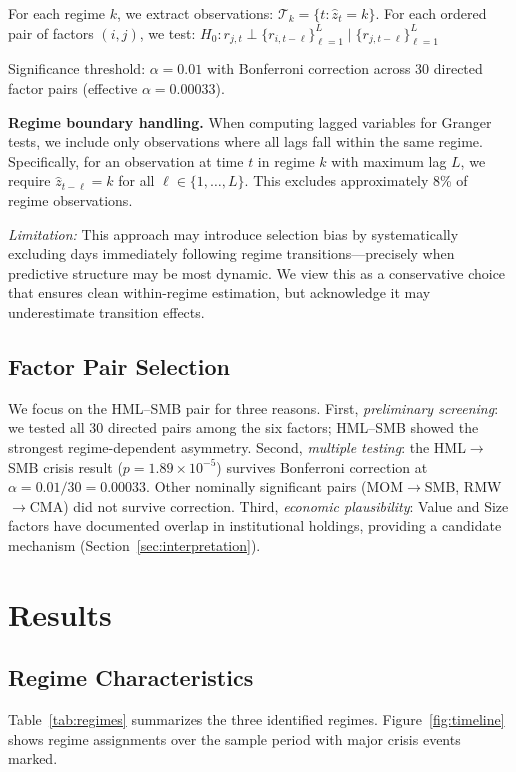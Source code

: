 \documentclass[sigconf]{acmart}
\begin{document}
For each regime $k$, we extract observations: $\mathcal{T}_k = \{t : \hat{z}_t = k\}$.
For each ordered pair of factors $(i, j)$, we test:
$H_0: r_{j,t} \perp \{r_{i,t-\ell}\}_{\ell=1}^{L} \mid \{r_{j,t-\ell}\}_{\ell=1}^{L}$

Significance threshold: $\alpha = 0.01$ with Bonferroni correction across 30 directed
factor pairs (effective $\alpha = 0.00033$).

\textbf{Regime boundary handling.} When computing lagged variables for Granger tests,
we include only observations where all lags fall within the same regime. Specifically,
for an observation at time $t$ in regime $k$ with maximum lag $L$, we require
$\hat{z}_{t-\ell} = k$ for all $\ell \in \{1, \ldots, L\}$. This excludes approximately
8\% of regime observations.

\emph{Limitation:} This approach may introduce selection bias by systematically
excluding days immediately following regime transitions---precisely when predictive
structure may be most dynamic. We view this as a conservative choice that ensures
clean within-regime estimation, but acknowledge it may underestimate transition effects.

\subsection{Factor Pair Selection}

We focus on the HML--SMB pair for three reasons. First, \emph{preliminary screening}:
we tested all 30 directed pairs among the six factors; HML--SMB showed the strongest
regime-dependent asymmetry. Second, \emph{multiple testing}: the HML$\to$SMB crisis
result ($p = 1.89 \times 10^{-5}$) survives Bonferroni correction at
$\alpha = 0.01/30 = 0.00033$. Other nominally significant pairs (MOM$\to$SMB,
RMW$\to$CMA) did not survive correction. Third, \emph{economic plausibility}:
Value and Size factors have documented overlap in institutional holdings, providing
a candidate mechanism (Section~\ref{sec:interpretation}).

\section{Results}

\subsection{Regime Characteristics}

Table~\ref{tab:regimes} summarizes the three identified regimes. Figure~\ref{fig:timeline}
shows regime assignments over the sample period with major crisis events marked.
\end{document}
